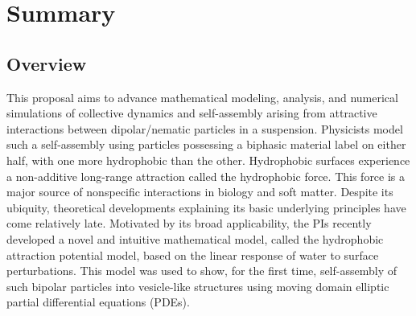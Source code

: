 \documentclass[10pt]{article}
\begin{document}
\section*{Summary}


\subsection*{Overview}
\vspace{-0.1in}
This proposal aims to advance mathematical modeling, analysis, and
numerical simulations of collective dynamics and self-assembly arising
from attractive interactions between dipolar/nematic particles in a
suspension. Physicists model such a self-assembly using particles
possessing a biphasic material label on either half, with one more
hydrophobic than the other. Hydrophobic surfaces experience a
non-additive long-range attraction called the hydrophobic force. This
force is a major source of nonspecific interactions in biology and soft
matter. Despite its ubiquity, theoretical developments explaining its
basic underlying principles have come relatively late.  Motivated by its
broad applicability, the PIs recently developed a novel and intuitive
mathematical model, called the hydrophobic attraction potential model,
based on the linear response of water to surface perturbations. This
model was used to show, for the first time, self-assembly of such
bipolar particles into vesicle-like structures using moving domain
elliptic partial differential equations (PDEs).


\end{document}

